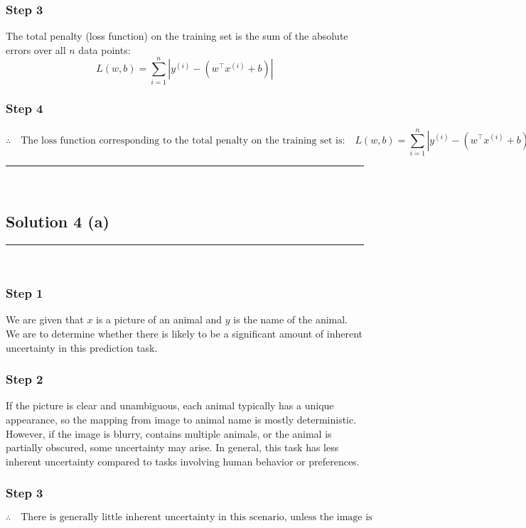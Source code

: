 \documentclass{article}
\begin{document}
\subsubsection*{Step 3}
\parbox{\textwidth}{
The total penalty (loss function) on the training set is the sum of the absolute errors over all $n$ data points:
\[
L(w, b) = \sum_{i=1}^n \left| y^{(i)} - (w^\top x^{(i)} + b) \right|
\]
}

\subsubsection*{Step 4}
\parbox{\textwidth}{
\[
\therefore \quad \text{The loss function corresponding to the total penalty on the training set is:} \quad L(w, b) = \sum_{i=1}^n \left| y^{(i)} - (w^\top x^{(i)} + b) \right|
\]
}

\noindent\rule{\textwidth}{0.4pt}\\

\newpage

\subsection*{Solution 4 (a)}
\noindent\rule{\textwidth}{0.4pt}\\

\subsubsection*{Step 1}
\parbox{\textwidth}{
We are given that $x$ is a picture of an animal and $y$ is the name of the animal. We are to determine whether there is likely to be a significant amount of inherent uncertainty in this prediction task.
}

\subsubsection*{Step 2}
\parbox{\textwidth}{
If the picture is clear and unambiguous, each animal typically has a unique appearance, so the mapping from image to animal name is mostly deterministic. However, if the image is blurry, contains multiple animals, or the animal is partially obscured, some uncertainty may arise. In general, this task has less inherent uncertainty compared to tasks involving human behavior or preferences.
}

\subsubsection*{Step 3}
\parbox{\textwidth}{
\[
\therefore \quad \text{There is generally little inherent uncertainty in this scenario, unless the image is ambiguous or unclear.}
\]
}
\end{document}
